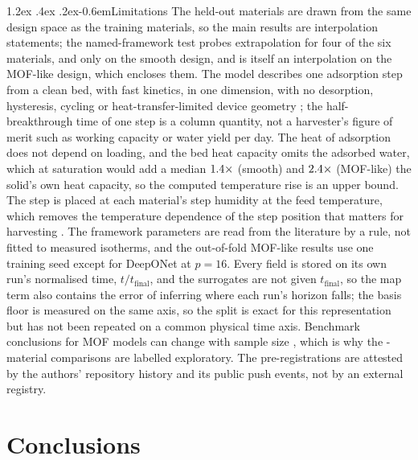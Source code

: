 \documentclass[10pt,a4paper]{article}
\makeatletter
\renewcommand\paragraph{\@startsection{paragraph}{4}{\z@}%
  {1.2ex \@plus .4ex \@minus .2ex}{-0.6em}{\normalfont\normalsize\bfseries}}
\makeatother
\begin{document}
\paragraph{Limitations} The held-out materials are drawn from the same design space as the
training materials, so the main results are interpolation statements; the named-framework
test probes extrapolation for four of the six materials, and only on the smooth design, and is itself an
interpolation on the MOF-like design, which encloses them. The model describes one adsorption
step from a clean bed, with fast kinetics, in one dimension, with no desorption, hysteresis,
cycling or heat-transfer-limited device geometry \cite{lapotin2019adsorption,delange2015adsorption};
the half-breakthrough time of one step is a column quantity, not a harvester's figure of
merit such as working capacity or water yield per day. The heat of adsorption does not
depend on loading, and the bed heat capacity omits the adsorbed water, which at saturation
would add a median \(1.4\times\) (smooth) and \(2.4\times\) (MOF-like)
the solid's own heat capacity, so the computed temperature rise is an upper bound. The step
is placed at each material's step humidity at the feed temperature, which removes the
temperature dependence of the step position that matters for harvesting
\cite{hastings2024high}. The framework parameters are read from the literature by a rule,
not fitted to measured isotherms, and the out-of-fold MOF-like results use one training
seed except for DeepONet at \(p = 16\). Every field is stored on its own run's normalised
time, \(t/t_{\mathrm{final}}\), and the surrogates are not given \(t_{\mathrm{final}}\), so
the map term also contains the error of inferring where each run's horizon falls; the basis
floor is measured on the same axis, so the split is exact for this representation but has
not been repeated on a common physical time axis. Benchmark conclusions for MOF models can change with sample size
\cite{abaei2026benchmark}, which is why the \nNclustLegacy-material comparisons are labelled
exploratory. The pre-registrations are attested by the authors' repository history and its
public push events, not by an external registry.

\section{Conclusions}
\label{sec:conclusions}
\end{document}

